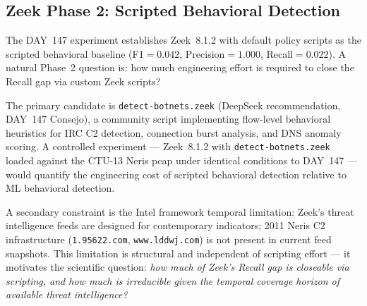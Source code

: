 \documentclass[11pt,a4paper]{article}
\begin{document}
    \subsection{Zeek Phase 2: Scripted Behavioral Detection}
    \label{sec:future:zeek}
    The DAY~147 experiment establishes Zeek~8.1.2 with default policy scripts as the
    scripted behavioral baseline (F1$=0.042$, Precision$=1.000$, Recall$=0.022$).
    A natural Phase~2 question is: how much engineering effort is required to close the
    Recall gap via custom Zeek scripts?

    The primary candidate is \texttt{detect-botnets.zeek} (DeepSeek recommendation,
    DAY~147 Consejo), a community script implementing flow-level behavioral heuristics
    for IRC C2 detection, connection burst analysis, and DNS anomaly scoring. A controlled
    experiment --- Zeek~8.1.2 with \texttt{detect-botnets.zeek} loaded against the CTU-13
    Neris pcap under identical conditions to DAY~147 --- would quantify the engineering
    cost of scripted behavioral detection relative to ML behavioral detection.

    A secondary constraint is the Intel framework temporal limitation: Zeek's threat
    intelligence feeds are designed for contemporary indicators; 2011 Neris C2 infrastructure
    (\texttt{1.95622.com}, \texttt{www.lddwj.com}) is not present in current feed snapshots.
    This limitation is structural and independent of scripting effort --- it motivates
    the scientific question: \emph{how much of Zeek's Recall gap is closeable via
    scripting, and how much is irreducible given the temporal coverage horizon of
    available threat intelligence?}


\end{document}
